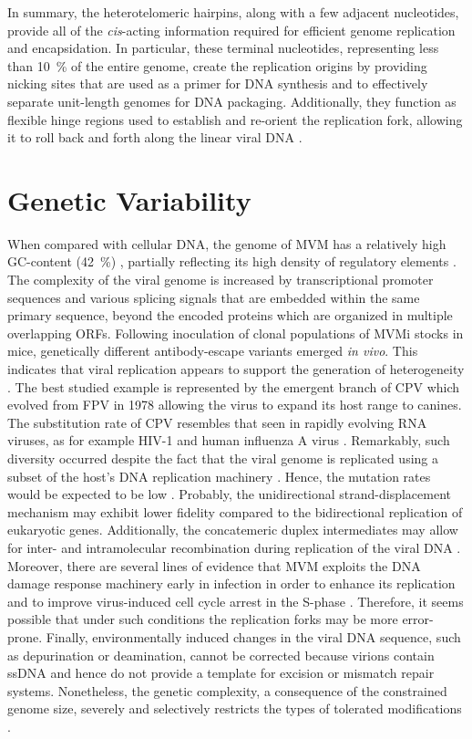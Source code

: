 In summary, the heterotelomeric hairpins, along with a few adjacent nucleotides, provide all of the \textit{cis}-acting information required for efficient genome replication and encapsidation. In particular, these terminal nucleotides, representing less than 10~\% of the entire genome, create the replication origins by providing nicking sites that are used as a primer for DNA synthesis and to effectively separate unit-length genomes for DNA packaging. Additionally, they function as flexible hinge regions used to establish and re-orient the replication fork, allowing it to roll back and forth along the linear viral DNA \cite{telomere2, telomere3, handbook, RHR}.        

\section{Genetic Variability}

When compared with cellular DNA, the genome of MVM has a relatively high GC-content (42~\%) \cite{pmid6298737}, partially reflecting its high density of regulatory elements \cite{telomere}. The complexity of the viral genome is increased by transcriptional promoter sequences and various splicing signals that are embedded within the same primary sequence, beyond the encoded proteins which are organized in multiple overlapping ORFs. Following inoculation of clonal populations of MVMi stocks in mice, genetically different antibody-escape variants emerged \textit{in vivo}. This indicates that viral replication appears to support the generation of heterogeneity \cite{pmid12552010}. The best studied example is represented by the emergent branch of CPV which evolved from FPV in 1978 allowing the virus to expand its host range to canines. The substitution rate of CPV resembles that seen in rapidly evolving RNA viruses, as for example HIV-1 and human influenza A virus \cite{pmid15626758}. Remarkably, such diversity occurred despite the fact that the viral genome is replicated using a subset of the host's DNA replication machinery \cite{pmid8614999, pmid10792046}. Hence, the mutation rates would be expected to be low \cite{pmid15964835, pmid19540301}. Probably, the unidirectional strand-displacement mechanism may exhibit lower fidelity compared to the bidirectional replication of eukaryotic genes. Additionally, the concatemeric duplex intermediates may allow for inter- and intramolecular recombination during replication of the viral DNA \cite{telomere}. Moreover, there are several lines of evidence that MVM exploits the DNA damage response machinery early in infection in order to enhance its replication and to improve virus-induced cell cycle arrest in the S-phase \cite{pmid20949077}. Therefore, it seems possible that under such conditions the replication forks may be more error-prone. Finally, environmentally induced changes in the viral DNA sequence, such as depurination or deamination, cannot be corrected because virions contain ssDNA and hence do not provide a template for excision or mismatch repair systems. Nonetheless, the genetic complexity, a consequence of the constrained genome size, severely and selectively restricts the types of tolerated modifications \cite{telomere}.   

